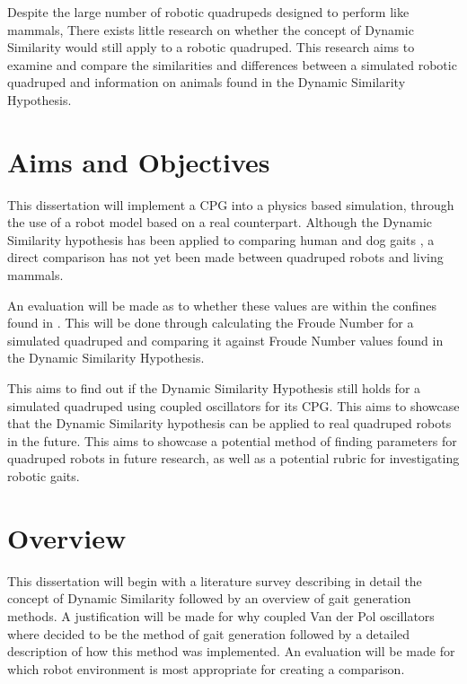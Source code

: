 Despite the large number of robotic quadrupeds designed to perform like mammals, There exists little research on whether the concept of Dynamic Similarity would still apply to a robotic quadruped. This research aims to examine and compare the similarities and differences between a simulated robotic quadruped and information on animals found in the Dynamic Similarity Hypothesis.

\section{Aims and Objectives}
This dissertation will implement a CPG into a physics based simulation, through the use of a robot model based on a real counterpart. Although the Dynamic Similarity hypothesis has been applied to comparing human and dog gaits \citep{Gan2018a}, a direct comparison has not yet been made between quadruped robots and living mammals. 

An evaluation will be made as to whether these values are within the confines found in \cite{Alexander1983}. This will be done through calculating the Froude Number for a simulated quadruped and comparing it against Froude Number values found in the Dynamic Similarity Hypothesis.

This aims to find out if the Dynamic Similarity Hypothesis still holds for a simulated quadruped using coupled oscillators for its CPG. This  aims to showcase that the Dynamic Similarity hypothesis can be applied to real quadruped robots in the future. This aims to showcase a potential method of finding parameters for quadruped robots in future research, as well as a potential rubric for investigating robotic gaits.


\section{Overview}
This dissertation will begin with a literature survey describing in  detail the concept of Dynamic Similarity followed by an overview of gait generation methods. A justification will be made for why coupled Van der Pol oscillators where decided to be the method of gait generation followed by a detailed description of how this method was implemented. An evaluation will be made for which robot environment is most appropriate for creating a comparison. 

